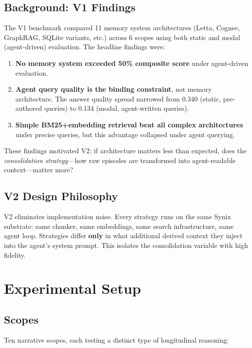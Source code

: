 \documentclass[11pt,a4paper]{article}
\begin{document}
\subsection{Background: V1 Findings}

The V1 benchmark compared 11 memory system architectures (Letta, Cognee, GraphRAG, SQLite variants, etc.) across 6 scopes using both static and modal (agent-driven) evaluation. The headline findings were:

\begin{enumerate}
    \item \textbf{No memory system exceeded 50\% composite score} under agent-driven evaluation.
    \item \textbf{Agent query quality is the binding constraint}, not memory architecture. The answer quality spread narrowed from 0.340 (static, pre-authored queries) to 0.134 (modal, agent-written queries).
    \item \textbf{Simple BM25+embedding retrieval beat all complex architectures} under precise queries, but this advantage collapsed under agent querying.
\end{enumerate}

These findings motivated V2: if architecture matters less than expected, does the \emph{consolidation strategy}---how raw episodes are transformed into agent-readable context---matter more?

\subsection{V2 Design Philosophy}

V2 eliminates implementation noise. Every strategy runs on the same Synix substrate: same chunker, same embeddings, same search infrastructure, same agent loop. Strategies differ \textbf{only} in what additional derived context they inject into the agent's system prompt. This isolates the consolidation variable with high fidelity.

\section{Experimental Setup}

\subsection{Scopes}

Ten narrative scopes, each testing a distinct type of longitudinal reasoning:
\end{document}
